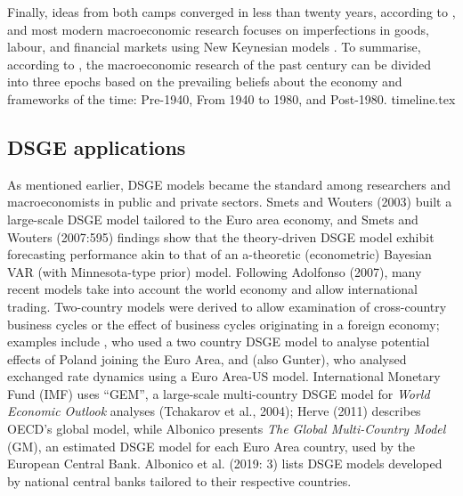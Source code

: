 Finally, ideas from both camps converged in less than twenty years, according to \textcite[1388]{blanchard_2000_what}, and most modern macroeconomic research focuses on imperfections in goods, labour, and financial markets using New Keynesian models \parencite{jordigal_2015_monetary}. To summarise, according to \textcite{blanchard_2000_what}, the macroeconomic research of the past century can be divided into three epochs based on the prevailing beliefs about the economy and frameworks of the time: Pre-1940, From 1940 to 1980, and Post-1980. 
{timeline.tex}

\subsection{DSGE applications}
As mentioned earlier, DSGE models became the standard among researchers and macroeconomists in public and private sectors. Smets and Wouters (2003) built a large-scale DSGE model tailored to the Euro area economy, and Smets and Wouters (2007:595) findings show that the theory-driven DSGE model exhibit forecasting performance akin to that of an a-theoretic (econometric) Bayesian VAR (with Minnesota-type prior) model. Following Adolfonso (2007), many recent models take into account the world economy and allow international trading. Two-country models were derived to allow examination of cross-country business cycles or the effect of business cycles originating in a foreign economy; examples include \textcite{kolasa_2009_structural}, who used a two country DSGE model to analyse potential effects of Poland joining the Euro Area, and \textcite{gregorydewalque_2017_an} (also Gunter), who analysed exchanged rate dynamics using a Euro Area-US model. International Monetary Fund (IMF) uses ``GEM'', a large-scale multi-country DSGE model for \textit{World Economic Outlook} analyses (Tchakarov et al., 2004); Herve (2011) describes OECD's global model, while Albonico presents \textit{The Global Multi-Country Model} (GM), an estimated DSGE model for each Euro Area country, used by the European Central Bank. Albonico et al. (2019: 3) lists DSGE models developed by national central banks tailored to their respective countries.

